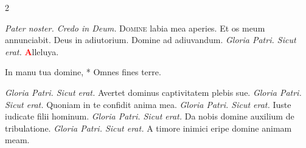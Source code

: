 \begin{multicols}{2}

\newline {}
\newline {}
\newline \textit{Pater noster. Credo in Deum.}
\lettrine[lines=2]{\zallmancaps \color{Red} D}{omine} labia mea aperies. \V Et os meum annunciabit. \V Deus in adiutorium. \R Domine ad adiuvandum. 
\newline \textit{Gloria Patri. Sicut erat.} \textcolor{Red}{\bfseries A}lleluya.
\begin{invitatory-full}
{In manu tua domine, * Omnes fines terre.}
\end{invitatory-full}
\newline {}
\newline {}
\newline {}    \textit{Gloria Patri. Sicut erat.}
\newline {} Avertet dominus captivitatem plebis sue. 
\newline {}    \textit{Gloria Patri. Sicut erat.}
\newline {} Quoniam in te confidit anima mea.
\newline {}    \textit{Gloria Patri. Sicut erat.}
\newline {} Iuste iudicate filii hominum.
\newline {}    \textit{Gloria Patri. Sicut erat.}
\newline {} Da nobis domine auxilium de tribulatione.
\newline {}    \textit{Gloria Patri. Sicut erat.}
\newline {} A timore inimici eripe domine animam meam.

\end{multicols}
